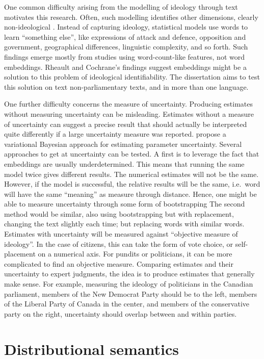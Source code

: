 \documentclass[
  openany]{book}
\begin{document}
One common difficulty arising from the modelling of ideology through text motivates this research. Often, such modelling identifies other dimensions, clearly non-ideological \citep{hirst2010party, lauderdale2016measuring}. Instead of capturing ideology, statistical models use words to learn ``something else'', like expressions of attack and defence, opposition and government, geographical differences, linguistic complexity, and so forth. Such findings emerge mostly from studies using word-count-like features, not word embeddings. Rheault and Cochrane's findings suggest embeddings might be a solution to this problem of ideological identifiability. The dissertation aims to test this solution on text non-parliamentary texts, and in more than one language.

One further difficulty concerns the measure of uncertainty. Producing estimates without measuring uncertainty can be misleading. Estimates without a measure of uncertainty can suggest a precise result that should actually be interpreted quite differently if a large uncertainty measure was reported. \citet{han2018conditional} propose a variational Bayesian approach for estimating parameter uncertainty. Several approaches to get at uncertainty can be tested. A first is to leverage the fact that embeddings are usually underdetermined. This means that running the same model twice gives different results. The numerical estimates will not be the same. However, if the model is successful, the relative results will be the same, i.e.~word will have the same ``meaning'' as measure through distance. Hence, one might be able to measure uncertainty through some form of bootstrapping The second method would be similar, also using bootstrapping but with replacement, changing the text slightly each time; but replacing words with similar words. Estimates with uncertainty will be measured against ``objective measure of ideology''. In the case of citizens, this can take the form of vote choice, or self-placement on a numerical axis. For pundits or politicians, it can be more complicated to find an objective measure. Comparing estimates and their uncertainty to expert judgments, the idea is to produce estimates that generally make sense. For example, measuring the ideology of politicians in the Canadian parliament, members of the New Democrat Party should be to the left, members of the Liberal Party of Canada in the center, and members of the conservative party on the right, uncertainty should overlap between and within parties.

\hypertarget{distributional-semantics}{%
\section{Distributional semantics}\label{distributional-semantics}}
\end{document}
